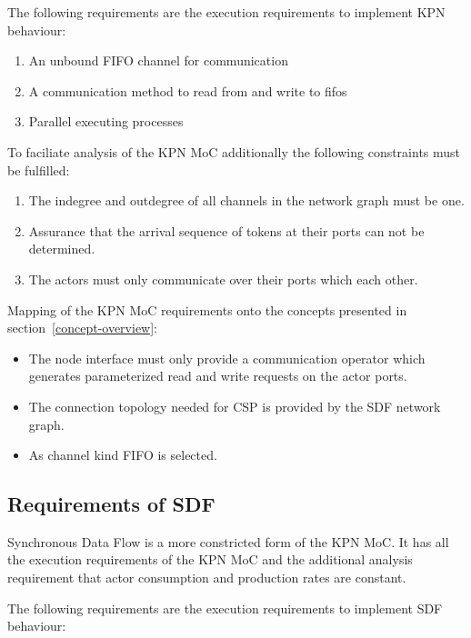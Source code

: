 The following requirements are the execution requirements to
implement KPN behaviour:

\begin{enumerate}
\item An unbound FIFO channel for communication
\item A communication method to read from and write to fifos
\item Parallel executing processes
\end{enumerate}

To faciliate analysis of the KPN MoC additionally the following
constraints must be fulfilled:
\begin{enumerate}
\item The indegree and outdegree of all channels in the network graph must be one.
\item Assurance that the arrival sequence of tokens at
      their ports can not be determined.
\item The actors must only communicate over their ports which each other.
\end{enumerate}

Mapping of the KPN MoC requirements onto the concepts presented in
section~\ref{concept-overview}:

\begin{itemize}

\item The node interface must only provide a communication operator which
      generates parameterized read and write requests on the actor ports.

\item The connection topology needed for CSP is provided by the SDF network graph.

\item As channel kind FIFO is selected.

\end{itemize}

\subsection{Requirements of SDF}
Synchronous Data Flow \cite{Lee87b:1987}
is a more constricted form of the KPN MoC.
It has all the execution requirements of the KPN MoC and
the additional analysis requirement that actor consumption and
production rates are constant.

The following requirements are the execution requirements to
implement SDF behaviour:

